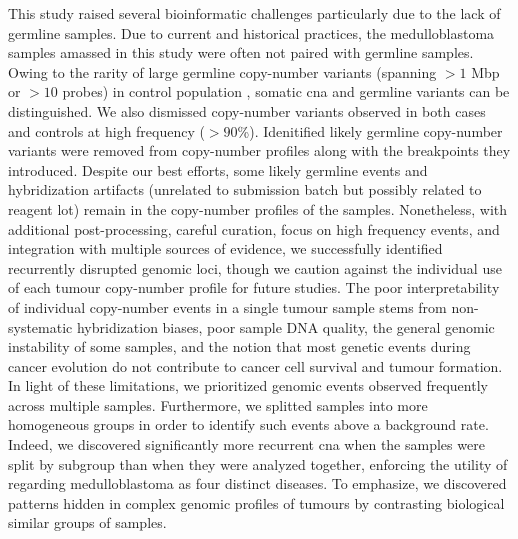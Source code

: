 This study raised several bioinformatic challenges particularly due to the lack of germline samples. Due to current and historical practices, the medulloblastoma samples amassed in this study were often not paired with germline samples. Owing to the rarity of large germline copy-number variants (spanning $> 1$ Mbp or $> 10$ probes) in control population , somatic \gls{cna} and germline variants can be distinguished. We also dismissed copy-number variants observed in both cases and controls at high frequency ($> 90$\%). Idenitified likely germline copy-number variants were removed from copy-number profiles along with the breakpoints they introduced. Despite our best efforts, some likely germline events and hybridization artifacts (unrelated to submission batch but possibly related to reagent lot) remain in the copy-number profiles of the samples. Nonetheless, with additional post-processing, careful curation, focus on high frequency events, and integration with multiple sources of evidence, we successfully identified recurrently disrupted genomic loci, though we caution against the individual use of each tumour copy-number profile for future studies. The poor interpretability of individual copy-number events in a single tumour sample stems from non-systematic hybridization biases, poor sample DNA quality, the general genomic instability of some samples, and the notion that most genetic events during cancer evolution do not contribute to cancer cell survival and tumour formation. In light of these limitations, we prioritized genomic events observed frequently across multiple samples. Furthermore, we splitted samples into more homogeneous groups in order to identify such events above a background rate. Indeed, we discovered significantly more recurrent \gls{cna} when the samples were split by subgroup than when they were analyzed together, enforcing the utility of regarding medulloblastoma as four distinct diseases. To emphasize, we discovered patterns hidden in complex genomic profiles of tumours by contrasting biological similar groups of samples.

